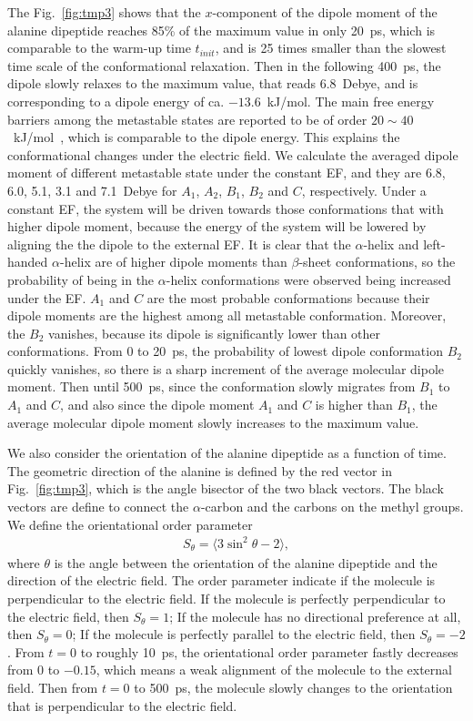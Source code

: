 \documentclass[a4paper,preprint,unsortedaddress,onecolumn]{revtex4-1}
\begin{document}
The Fig.~\ref{fig:tmp3}
shows that the $x$-component of the dipole moment of the alanine dipeptide
reaches 85\% of the maximum value in only 20~ps, which is comparable to
the warm-up time $t_{init}$, and is 25 times
smaller than the slowest time scale of the conformational relaxation.
Then in the following 400~ps, the dipole slowly relaxes to the 
maximum value, that reads
6.8~Debye, and is  corresponding to a dipole energy of ca.
$-13.6$~kJ/mol. The main free energy barriers among the
metastable states are reported to be of order $20\sim 40$~kJ/mol~\cite{bohner2012algorithm},
which is comparable to the dipole energy. This explains the 
conformational changes under the electric field.
We calculate the averaged dipole moment of different metastable state
under the constant EF, and they are 6.8, 6.0, 5.1, 3.1 and 7.1~Debye
for $A_1$, $A_2$, $B_1$, $B_2$ and $C$, respectively.
Under a constant EF, the system will be driven towards those
conformations that with higher dipole moment, because the
energy of the system will be lowered by aligning the the dipole
to the external EF.
It is clear that
the $\alpha$-helix and left-handed $\alpha$-helix are of higher
dipole moments than $\beta$-sheet conformations, so the probability
of being in the $\alpha$-helix conformations were
observed being increased under the EF.  $A_1$ and $C$ are the most
probable conformations because their dipole moments are the highest
among all metastable conformation. Moreover, the $B_2$  vanishes, because
its dipole is significantly lower than other conformations.
From 0 to 20~ps, the probability of
lowest dipole conformation $B_2$ quickly
vanishes, so there is a sharp increment of the average molecular
dipole moment. Then until 500~ps, since the conformation slowly migrates from
$B_1$ to $A_1$ and $C$, and also since the dipole moment $A_1$ and $C$
is higher than $B_1$, the average molecular dipole moment slowly increases
to the maximum value.

We also consider the orientation of the alanine dipeptide as a function
of time.
The geometric direction of the alanine is defined by the red vector in
Fig.~\ref{fig:tmp3}, which is the angle bisector of the two black vectors.
The black vectors are define to connect the $\alpha$-carbon and the carbons
on the methyl groups. We define the orientational order parameter
\begin{align}
  S_\theta = \langle 3\sin^2\theta - 2\rangle,
\end{align}
where $\theta$ is the angle between the orientation of the alanine dipeptide
and the direction of the electric field. The order parameter
indicate if the molecule is perpendicular to the electric field.
If the molecule is perfectly perpendicular to the electric field, then $S_\theta = 1$;
If the molecule has no directional
preference at all, then $S_\theta = 0$;
If the molecule is perfectly parallel to the electric field, then $S_\theta = -2$.
From $t=0$ to roughly 10~ps, the orientational order parameter fastly
decreases from 0 to $-0.15$, which means a weak alignment of the molecule to the external field.
Then from $t=0$ to 500~ps, the molecule slowly changes to the orientation
that is perpendicular to the electric field.
\end{document}
